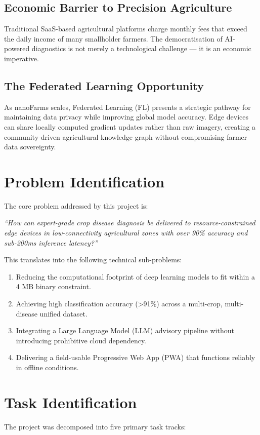 \documentclass[12pt,oneside]{report}
\begin{document}
\subsection{Economic Barrier to Precision Agriculture}
Traditional SaaS-based agricultural platforms charge monthly fees that exceed the daily income of many smallholder farmers. The democratisation of AI-powered diagnostics is not merely a technological challenge — it is an economic imperative.

\subsection{The Federated Learning Opportunity}
As nanoFarms scales, Federated Learning (FL) presents a strategic pathway for maintaining data privacy while improving global model accuracy. Edge devices can share locally computed gradient updates rather than raw imagery, creating a community-driven agricultural knowledge graph without compromising farmer data sovereignty.

\section{Problem Identification}
The core problem addressed by this project is:

\begin{center}
\textit{``How can expert-grade crop disease diagnosis be delivered to resource-constrained edge devices in low-connectivity agricultural zones with over 90\% accuracy and sub-200ms inference latency?''}
\end{center}

This translates into the following technical sub-problems:
\begin{enumerate}
    \item Reducing the computational footprint of deep learning models to fit within a 4 MB binary constraint.
    \item Achieving high classification accuracy (>91\%) across a multi-crop, multi-disease unified dataset.
    \item Integrating a Large Language Model (LLM) advisory pipeline without introducing prohibitive cloud dependency.
    \item Delivering a field-usable Progressive Web App (PWA) that functions reliably in offline conditions.
\end{enumerate}

\section{Task Identification}
The project was decomposed into five primary task tracks:
\end{document}
